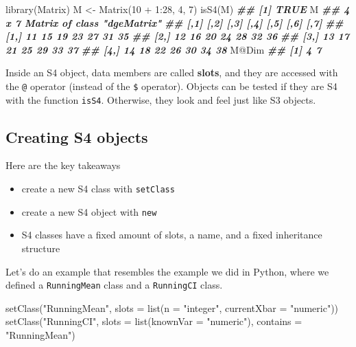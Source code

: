 \documentclass[
  12pt,
]{krantz}
\makeatletter
\newenvironment{Shaded}{\begin{snugshade}}{\end{snugshade}}
\newcommand{\AttributeTok}[1]{\textcolor[rgb]{0.61,0.61,0.61}{#1}}
\newcommand{\DecValTok}[1]{\textcolor[rgb]{0.06,0.06,0.06}{#1}}
\newcommand{\DocumentationTok}[1]{\textcolor[rgb]{0.37,0.37,0.37}{\textbf{\textit{#1}}}}
\newcommand{\FunctionTok}[1]{\textcolor[rgb]{0,0,0}{#1}}
\newcommand{\NormalTok}[1]{#1}
\newcommand{\OtherTok}[1]{\textcolor[rgb]{0.37,0.37,0.37}{#1}}
\newcommand{\SpecialCharTok}[1]{\textcolor[rgb]{0,0,0}{#1}}
\newcommand{\StringTok}[1]{\textcolor[rgb]{0.5,0.5,0.5}{#1}}
\providecommand{\tightlist}{%
  \setlength{\itemsep}{0pt}\setlength{\parskip}{0pt}}
\newenvironment{kframe}{%
\medskip{}
\setlength{\fboxsep}{.8em}
 \def\at@end@of@kframe{}%
 \ifinner\ifhmode%
  \def\at@end@of@kframe{\end{minipage}}%
  \begin{minipage}{\columnwidth}%
 \fi\fi%
 \def\FrameCommand##1{\hskip\@totalleftmargin \hskip-\fboxsep
 \colorbox{shadecolor}{##1}\hskip-\fboxsep
     \hskip-\linewidth \hskip-\@totalleftmargin \hskip\columnwidth}%
 \MakeFramed {\advance\hsize-\width
   \@totalleftmargin\z@ \linewidth\hsize
   \@setminipage}}%
 {\par\unskip\endMakeFramed%
 \at@end@of@kframe}
\renewenvironment{Shaded}{\begin{kframe}}{\end{kframe}}
\makeatother
\begin{document}
\begin{Shaded}
\begin{Highlighting}[]
\FunctionTok{library}\NormalTok{(Matrix)}
\NormalTok{M }\OtherTok{\textless{}{-}} \FunctionTok{Matrix}\NormalTok{(}\DecValTok{10} \SpecialCharTok{+} \DecValTok{1}\SpecialCharTok{:}\DecValTok{28}\NormalTok{, }\DecValTok{4}\NormalTok{, }\DecValTok{7}\NormalTok{)}
\FunctionTok{isS4}\NormalTok{(M)}
\DocumentationTok{\#\# [1] TRUE}
\NormalTok{M}
\DocumentationTok{\#\# 4 x 7 Matrix of class "dgeMatrix"}
\DocumentationTok{\#\#      [,1] [,2] [,3] [,4] [,5] [,6] [,7]}
\DocumentationTok{\#\# [1,]   11   15   19   23   27   31   35}
\DocumentationTok{\#\# [2,]   12   16   20   24   28   32   36}
\DocumentationTok{\#\# [3,]   13   17   21   25   29   33   37}
\DocumentationTok{\#\# [4,]   14   18   22   26   30   34   38}
\NormalTok{M}\SpecialCharTok{@}\NormalTok{Dim}
\DocumentationTok{\#\# [1] 4 7}
\end{Highlighting}
\end{Shaded}

Inside an S4 object, data members are called \textbf{slots}, and they are accessed with the \texttt{@} operator (instead of the \texttt{\$} operator). Objects can be tested if they are S4 with the function \texttt{isS4}. Otherwise, they look and feel just like S3 objects.

\hypertarget{creating-s4-objects}{%
\subsection{Creating S4 objects}\label{creating-s4-objects}}

Here are the key takeaways

\begin{itemize}
\tightlist
\item
  create a new S4 class with \texttt{setClass}
\item
  create a new S4 object with \texttt{new}
\item
  S4 classes have a fixed amount of slots, a name, and a fixed inheritance structure
\end{itemize}

Let's do an example that resembles the example we did in Python, where we defined a \texttt{RunningMean} class and a \texttt{RunningCI} class.

\begin{Shaded}
\begin{Highlighting}[]
\FunctionTok{setClass}\NormalTok{(}\StringTok{"RunningMean"}\NormalTok{,}
         \AttributeTok{slots =} \FunctionTok{list}\NormalTok{(}\AttributeTok{n =} \StringTok{"integer"}\NormalTok{, }
                      \AttributeTok{currentXbar =} \StringTok{"numeric"}\NormalTok{))}
\FunctionTok{setClass}\NormalTok{(}\StringTok{"RunningCI"}\NormalTok{,}
         \AttributeTok{slots =} \FunctionTok{list}\NormalTok{(}\AttributeTok{knownVar =} \StringTok{"numeric"}\NormalTok{),}
         \AttributeTok{contains =} \StringTok{"RunningMean"}\NormalTok{)}
\end{Highlighting}
\end{Shaded}
\end{document}
